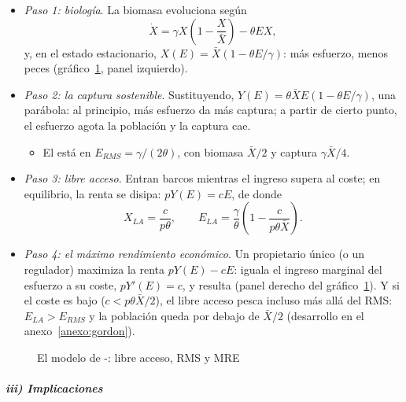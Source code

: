 \documentclass[11pt]{article}
\begin{document}
\begin{itemize}
\item \emph{Paso 1: biología}. La biomasa evoluciona según
  \[\dot X=\gamma X\left(1-\frac{X}{\bar X}\right)-\theta E X,\]
  y, en el estado estacionario, $X(E)=\bar X\left(1-\theta E/\gamma\right)$: más esfuerzo, menos peces (gráfico~\ref{fig:gordon-schaefer}, panel izquierdo).
\item \emph{Paso 2: la captura sostenible}. Sustituyendo, $Y(E)=\theta\bar X E\left(1-\theta E/\gamma\right)$, una parábola: al principio, más esfuerzo da más captura; a partir de cierto punto, el esfuerzo agota la población y la captura cae.
  \begin{itemize}
  \item El  está en $E_{\mathit{RMS}}=\gamma/(2\theta)$, con biomasa $\bar X/2$ y captura $\gamma\bar X/4$.
  \end{itemize}
\item \emph{Paso 3: libre acceso}. Entran barcos mientras el ingreso supera al coste; en equilibrio, la renta se disipa: $pY(E)=cE$, de donde
  \[X_{\mathit{LA}}=\frac{c}{p\theta},\qquad E_{\mathit{LA}}=\frac{\gamma}{\theta}\left(1-\frac{c}{p\theta\bar X}\right).\]
\item \emph{Paso 4: el máximo rendimiento económico}. Un propietario único (o un regulador) maximiza la renta $pY(E)-cE$: iguala el ingreso marginal del esfuerzo a su coste, $pY'(E)=c$, y resulta
  (panel derecho del gráfico~\ref{fig:gordon-schaefer}). Y si el coste es bajo ($c<p\theta\bar X/2$), el libre acceso pesca incluso más allá del RMS: $E_{\mathit{LA}}>E_{\mathit{RMS}}$ y la población queda por debajo de $\bar X/2$ (desarrollo en el anexo~\ref{anexo:gordon}).
\end{itemize}

\begin{figure}[H]
\centering
\caption{El modelo de -: libre acceso, RMS y MRE}\label{fig:gordon-schaefer}
\end{figure}

\subparagraph{iii) Implicaciones}
\end{document}

